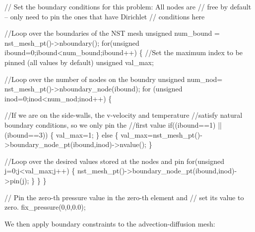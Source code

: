 \begin{DoxyCodeInclude}
 \textcolor{comment}{// Set the boundary conditions for this problem: All nodes are}
 \textcolor{comment}{// free by default -- only need to pin the ones that have Dirichlet }
 \textcolor{comment}{// conditions here}

 \textcolor{comment}{//Loop over the boundaries of the NST mesh}
 \textcolor{keywordtype}{unsigned} num\_bound = nst\_mesh\_pt()->nboundary();
 \textcolor{keywordflow}{for}(\textcolor{keywordtype}{unsigned} ibound=0;ibound<num\_bound;ibound++)
  \{
   \textcolor{comment}{//Set the maximum index to be pinned (all values by default)}
   \textcolor{keywordtype}{unsigned} val\_max;

   \textcolor{comment}{//Loop over the number of nodes on the boundry}
   \textcolor{keywordtype}{unsigned} num\_nod= nst\_mesh\_pt()->nboundary\_node(ibound);
   \textcolor{keywordflow}{for} (\textcolor{keywordtype}{unsigned} inod=0;inod<num\_nod;inod++)
    \{

     \textcolor{comment}{//If we are on the side-walls, the v-velocity and temperature}
     \textcolor{comment}{//satisfy natural boundary conditions, so we only pin the}
     \textcolor{comment}{//first value}
     \textcolor{keywordflow}{if}((ibound==1) || (ibound==3)) 
      \{
       val\_max=1;
      \}
     \textcolor{keywordflow}{else}
      \{
       val\_max=nst\_mesh\_pt()->boundary\_node\_pt(ibound,inod)->nvalue();
      \}

     \textcolor{comment}{//Loop over the desired values stored at the nodes and pin}
     \textcolor{keywordflow}{for}(\textcolor{keywordtype}{unsigned} j=0;j<val\_max;j++)
      \{
       nst\_mesh\_pt()->boundary\_node\_pt(ibound,inod)->pin(j);
      \}
    \}
  \}
 
 \textcolor{comment}{// Pin the zero-th pressure value in the zero-th element and}
 \textcolor{comment}{// set its value to zero.}
 fix\_pressure(0,0,0.0);

\end{DoxyCodeInclude}


We then apply boundary constraints to the advection-\/diffusion mesh\+:


